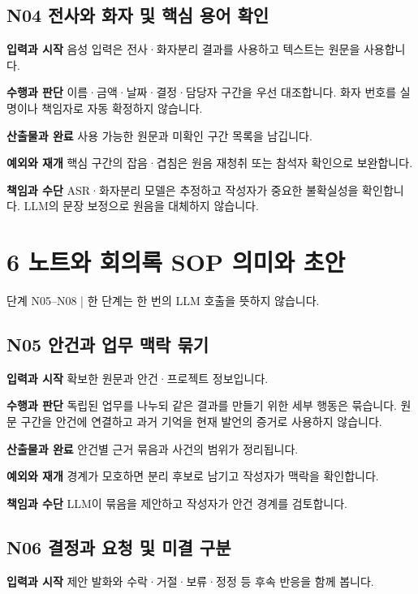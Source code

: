 \documentclass[a4paper,10pt]{article}
\begin{document}
\endgroup
\begingroup\setlength{\parskip}{3pt}
\subsection*{N04 전사와 화자 및 핵심 용어 확인}
\noindent\textbf{입력과 시작} 음성 입력은 전사·화자분리 결과를 사용하고 텍스트는 원문을 사용합니다.


\noindent\textbf{수행과 판단} 이름·금액·날짜·결정·담당자 구간을 우선 대조합니다. 화자 번호를 실명이나 책임자로 자동 확정하지 않습니다.


\noindent\textbf{산출물과 완료} 사용 가능한 원문과 미확인 구간 목록을 남깁니다.


\noindent\textbf{예외와 재개} 핵심 구간의 잡음·겹침은 원음 재청취 또는 참석자 확인으로 보완합니다.


\noindent\textbf{책임과 수단} ASR·화자분리 모델은 추정하고 작성자가 중요한 불확실성을 확인합니다. LLM의 문장 보정으로 원음을 대체하지 않습니다.


\endgroup
\clearpage
\section*{6 노트와 회의록 SOP 의미와 초안}
단계 N05–N08  |  한 단계는 한 번의 LLM 호출을 뜻하지 않습니다.


\begingroup\setlength{\parskip}{3pt}
\subsection*{N05 안건과 업무 맥락 묶기}
\noindent\textbf{입력과 시작} 확보한 원문과 안건·프로젝트 정보입니다.


\noindent\textbf{수행과 판단} 독립된 업무를 나누되 같은 결과를 만들기 위한 세부 행동은 묶습니다. 원문 구간을 안건에 연결하고 과거 기억을 현재 발언의 증거로 사용하지 않습니다.


\noindent\textbf{산출물과 완료} 안건별 근거 묶음과 사건의 범위가 정리됩니다.


\noindent\textbf{예외와 재개} 경계가 모호하면 분리 후보로 남기고 작성자가 맥락을 확인합니다.


\noindent\textbf{책임과 수단} LLM이 묶음을 제안하고 작성자가 안건 경계를 검토합니다.


\endgroup
\begingroup\setlength{\parskip}{3pt}
\subsection*{N06 결정과 요청 및 미결 구분}
\noindent\textbf{입력과 시작} 제안 발화와 수락·거절·보류·정정 등 후속 반응을 함께 봅니다.
\end{document}
